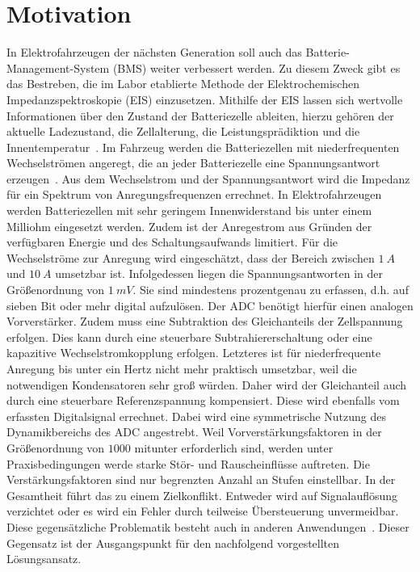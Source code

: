 \section{Motivation}	

In Elektrofahrzeugen der nächsten Generation soll auch das Batterie-Management-System (BMS) weiter verbessert werden. Zu diesem Zweck gibt es das Bestreben, die im Labor etablierte Methode der Elektrochemischen Impedanzspektroskopie (EIS) einzusetzen. Mithilfe der EIS lassen sich wertvolle Informationen über den Zustand der Batteriezelle ableiten, hierzu gehören der aktuelle Ladezustand, die Zellalterung, die Leistungsprädiktion und die Innentemperatur~\cite{Schmidt-2013}. Im Fahrzeug werden die Batteriezellen mit niederfrequenten Wechselströmen angeregt, die an jeder Batteriezelle eine Spannungsantwort erzeugen~\cite{KeilJossen-2012, Roscher-2016, Hammerschmidt-2016}. Aus dem Wechselstrom und der Spannungsantwort wird die Impedanz für ein Spektrum von Anregungsfrequenzen errechnet. In Elektrofahrzeugen werden Batteriezellen mit sehr geringem Innenwiderstand bis unter einem Milliohm eingesetzt werden. Zudem ist der Anregestrom aus Gründen der verfügbaren Energie und des Schaltungsaufwands limitiert. Für die Wechselströme zur Anregung wird eingeschätzt, dass der Bereich zwischen $\SI{1}{A}$ und $\SI{10}{A}$ umsetzbar ist. Infolgedessen liegen die Spannungsantworten in der Größenordnung  von $\SI{1}{mV}$. Sie sind mindestens prozentgenau zu erfassen, d.h. auf sieben Bit oder mehr digital aufzulösen. Der ADC benötigt hierfür einen analogen Vorverstärker. Zudem muss eine Subtraktion des Gleichanteils der Zellspannung erfolgen. Dies kann durch eine steuerbare Subtrahiererschaltung oder eine kapazitive Wechselstromkopplung erfolgen. Letzteres ist für niederfrequente Anregung bis unter ein Hertz nicht mehr praktisch umsetzbar, weil die notwendigen Kondensatoren sehr groß würden. Daher wird der Gleichanteil auch durch eine steuerbare Referenzspannung kompensiert. Diese wird ebenfalls vom erfassten Digitalsignal errechnet. Dabei wird eine symmetrische Nutzung des Dynamikbereichs des ADC angestrebt. Weil Vorverstärkungsfaktoren in der Größenordnung von $1000$ mitunter erforderlich sind, werden unter Praxisbedingungen werde starke Stör- und Rauscheinflüsse auftreten. Die Verstärkungsfaktoren sind nur begrenzten Anzahl an Stufen einstellbar. In der Gesamtheit führt das zu einem Zielkonflikt. Entweder wird auf Signalauflösung verzichtet oder es wird ein Fehler durch teilweise Übersteuerung unvermeidbar. Diese gegensätzliche Problematik besteht auch in anderen Anwendungen~\cite{Abel-1991,Ting-2013, Zhou-2019, Chan-2012}.
Dieser Gegensatz ist der Ausgangspunkt für den nachfolgend vorgestellten Lösungsansatz.

